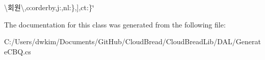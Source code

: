 \begin{DoxyCompactItemize}
\textbackslash{}\textquotesingle{}회원\textbackslash{}\textquotesingle{}\textquotesingle{},\textquotesingle{}o\textquotesingle{}\+:\textquotesingle{}orderby\textquotesingle{},\textquotesingle{}j\textquotesingle{}\+:\textquotesingle{}\textquotesingle{},\textquotesingle{}nl\textquotesingle{}\+:\textquotesingle{}\textquotesingle{}\},\mbox{]},\textquotesingle{}ct\textquotesingle{}\+:\textquotesingle{}\textquotesingle{}\}\char`\"{}\hypertarget{class_cloud_bread_lib_1_1_d_a_l_1_1_generate_c_b_q_1_1_generate_c_b_q_a91fcb156883a57b49b6766b1832f9d10}{}\label{class_cloud_bread_lib_1_1_d_a_l_1_1_generate_c_b_q_1_1_generate_c_b_q_a91fcb156883a57b49b6766b1832f9d10}

\end{DoxyCompactItemize}


The documentation for this class was generated from the following file\+:\begin{DoxyCompactItemize}
\item 
C\+:/\+Users/dwkim/\+Documents/\+Git\+Hub/\+Cloud\+Bread/\+Cloud\+Bread\+Lib/\+D\+A\+L/Generate\+C\+B\+Q.\+cs\end{DoxyCompactItemize}
